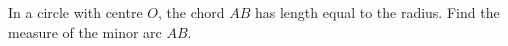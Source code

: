 In a circle with centre $O$, the chord $AB$ has length equal to the radius. Find the measure of the minor arc $AB$.
